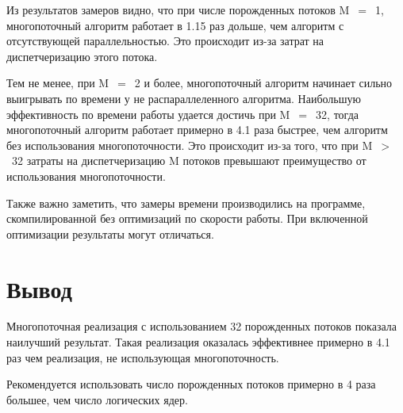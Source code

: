 Из результатов замеров видно, что при числе порожденных потоков M~$=$~1, многопоточный алгоритм работает в 1.15 раз дольше, чем алгоритм с отсутствующей параллельностью. Это происходит из-за затрат на диспетчеризацию этого потока.

Тем не менее, при M~$=$~2 и более, многопоточный алгоритм начинает сильно выигрывать по времени у не распараллеленного алгоритма. Наибольшую эффективность по времени работы удается достичь при M~$=$~32, тогда многопоточный алгоритм работает примерно в 4.1 раза быстрее, чем алгоритм без использования многопоточности. Это происходит из-за того, что при M~$>$~32 затраты на диспетчеризацию M потоков превышают преимущество от использования многопоточности.

Также важно заметить, что замеры времени производились на программе, скомпилированной без оптимизаций по скорости работы. При включенной оптимизации результаты могут отличаться.

\section*{Вывод}
Многопоточная реализация с использованием 32 порожденных потоков показала наилучший результат. Такая реализация оказалась эффективнее примерно в 4.1 раз чем реализация, не использующая многопоточность.

Рекомендуется использовать число порожденных потоков примерно в 4 раза большее, чем число логических ядер.